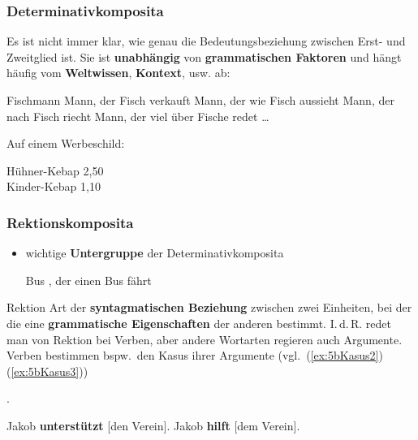 \begin{frame}
\frametitle{Determinativkomposita}
	
Es ist nicht immer klar, wie genau die Bedeutungsbeziehung zwischen Erst- und Zweitglied ist. Sie ist \textbf{unabhängig} von \textbf{grammatischen Faktoren} und hängt häufig vom \textbf{Weltwissen}, \textbf{Kontext}, usw. ab:
	
	\ea Fischmann
		\ea Mann, der Fisch verkauft
		\ex Mann, der wie Fisch aussieht
		\ex Mann, der nach Fisch riecht
		\ex Mann, der viel über Fische redet
		\ex \ldots 
		\z 

\pause 
		
	\ex Auf einem Werbeschild:
	
	Hühner-Kebap 2,50\\
	Kinder-Kebap 1,10 
	\z
	
	
\end{frame}




\begin{frame}
\frametitle{Rektionskomposita}

\begin{itemize}
	\item wichtige \textbf{Untergruppe} der Determinativkomposita
	
	\ea Bus \ras {}, der einen Bus fährt
	\z 
\end{itemize}

\pause 

\begin{block}{Rektion}
	Art der \textbf{syntagmatischen Beziehung} zwischen zwei Einheiten, bei der die eine \textbf{grammatische Eigenschaften} der anderen bestimmt. I.\,d.\,R. redet man von Rektion bei Verben, aber andere Wortarten regieren auch Argumente.  Verben bestimmen bspw.\ den Kasus ihrer Argumente (vgl.\ (\ref{ex:5bKasus2}) \vs (\ref{ex:5bKasus3})) 
	
	\hfill \citep[vgl.][]{McIntyre13a, MyP16e}.

\end{block}

\ea 
	\ea\label{ex:5bKasus2} {Jakob \textbf{unterstützt} [den Verein].}
	\ex\label{ex:5bKasus3} {Jakob \textbf{hilft} [dem Verein].}
	\z
\z  

\end{frame}


